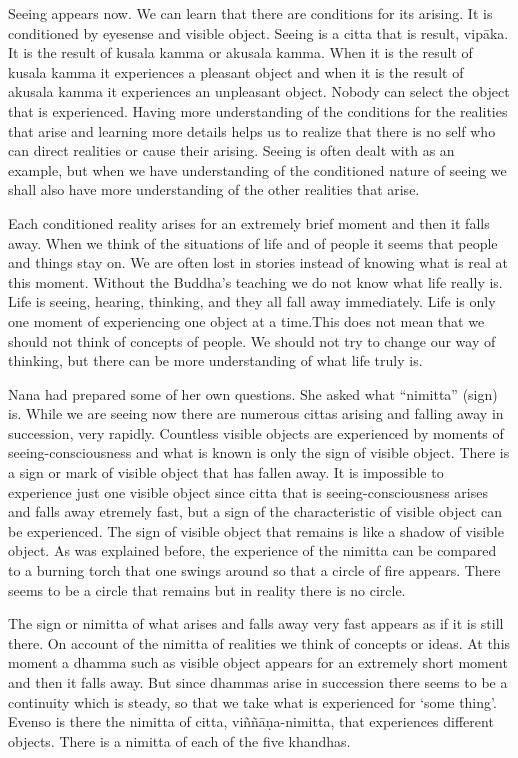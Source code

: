Seeing appears now. We can learn that there are conditions for its
arising. It is conditioned by eyesense and visible object. Seeing is a
citta that is result, vipāka. It is the result of kusala kamma or
akusala kamma. When it is the result of kusala kamma it experiences a
pleasant object and when it is the result of akusala kamma it
experiences an unpleasant object. Nobody can select the object that is
experienced. Having more understanding of the conditions for the
realities that arise and learning more details helps us to realize that
there is no self who can direct realities or cause their arising. Seeing
is often dealt with as an example, but when we have understanding of the
conditioned nature of seeing we shall also have more understanding of
the other realities that arise.

Each conditioned reality arises for an extremely brief moment and then
it falls away. When we think of the situations of life and of people it
seems that people and things stay on. We are often lost in stories
instead of knowing what is real at this moment. Without the Buddha's
teaching we do not know what life really is. Life is seeing, hearing,
thinking, and they all fall away immediately. Life is only one moment of
experiencing one object at a time.This does not mean that we should not
think of concepts of people. We should not try to change our way of
thinking, but there can be more understanding of what life truly is.

Nana had prepared some of her own questions. She asked what ``nimitta''
(sign) is. While we are seeing now there are numerous cittas arising and
falling away in succession, very rapidly. Countless visible objects are
experienced by moments of seeing-consciousness and what is known is only
the sign of visible object. There is a sign or mark of visible object
that has fallen away. It is impossible to experience just one visible
object since citta that is seeing-consciousness arises and falls away
etremely fast, but a sign of the characteristic of visible object can be
experienced. The sign of visible object that remains is like a shadow of
visible object. As was explained before, the experience of the nimitta
can be compared to a burning torch that one swings around so that a
circle of fire appears. There seems to be a circle that remains but in
reality there is no circle.

The sign or nimitta of what arises and falls away very fast appears as
if it is still there. On account of the nimitta of realities we think of
concepts or ideas. At this moment a dhamma such as visible object
appears for an extremely short moment and then it falls away. But since
dhammas arise in succession there seems to be a continuity which is
steady, so that we take what is experienced for `some thing'. Evenso is
there the nimitta of citta, viññāṇa-nimitta, that experiences different
objects. There is a nimitta of each of the five khandhas.

